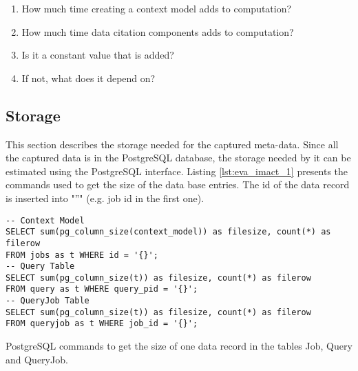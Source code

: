 \documentclass[draft,final]{vutinfth} %
\begin{document}
\begin{enumerate}
	\item How much time creating a context model adds to computation?
	\item How much time data citation components adds to computation?
	\item Is it a constant value that is added?
	\item If not, what does it depend on?
\end{enumerate} 


\subsection*{Storage}\label{Evaluation:impact_stor}
This section describes the storage needed for the captured meta-data. Since all the captured data is in the PostgreSQL database, the storage needed by it can be estimated using the PostgreSQL interface. Listing \ref{lst:eva_imact_1} presents the commands used to get the size of the data base entries. The id of the data record is inserted into "''" (e.g. job id in the first one).  

\begin{listing}[ht]
	\begin{verbatim}
-- Context Model 
SELECT sum(pg_column_size(context_model)) as filesize, count(*) as filerow 
FROM jobs as t WHERE id = '{}';
-- Query Table
SELECT sum(pg_column_size(t)) as filesize, count(*) as filerow 
FROM query as t WHERE query_pid = '{}';
-- QueryJob Table
SELECT sum(pg_column_size(t)) as filesize, count(*) as filerow 
FROM queryjob as t WHERE job_id = '{}';
	\end{verbatim}
	\caption{PostgreSQL commands to get the size of one data record in the tables Job, Query and QueryJob.}
	\label{lst:eva_imact_1}
\end{listing}	
\end{document}
